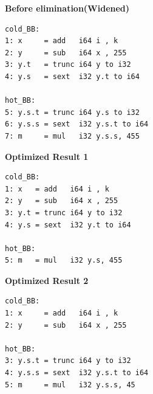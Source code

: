 \par\medskip
\begin{center}
\begin{minipage}{1\textwidth}

\noindent\begin{minipage}[t]{0.52\linewidth}
\raggedright
\textbf{Before elimination(Widened)}\\[0.15em]
\begin{lstlisting}[basicstyle=\ttfamily\normalsize,aboveskip=0pt,belowskip=0pt]
cold_BB:
1: x     = add   i64 i , k
2: y     = sub   i64 x , 255
3: y.t   = trunc i64 y to i32
4: y.s   = sext  i32 y.t to i64

hot_BB:
5: y.s.t = trunc i64 y.s to i32
6: y.s.s = sext  i32 y.s.t to i64
7: m     = mul   i32 y.s.s, 455

\end{lstlisting}
\end{minipage}

\vspace{0.7em}

\noindent\begin{minipage}[t]{0.48\linewidth}
\raggedright
\textbf{Optimized Result 1}\\[0.15em]
\begin{lstlisting}[basicstyle=\ttfamily\normalsize,aboveskip=0pt,belowskip=0pt]
cold_BB:
1: x   = add   i64 i , k
2: y   = sub   i64 x , 255
3: y.t = trunc i64 y to i32
4: y.s = sext  i32 y.t to i64

hot_BB:
5: m   = mul   i32 y.s, 455
\end{lstlisting}
\end{minipage}%
\hfill%
\begin{minipage}[t]{0.48\linewidth}
\raggedright
\textbf{Optimized Result 2}\\[0.15em]
\begin{lstlisting}[basicstyle=\ttfamily\normalsize,aboveskip=0pt,belowskip=0pt]
cold_BB:
1: x     = add   i64 i , k
2: y     = sub   i64 x , 255

hot_BB:
3: y.s.t = trunc i64 y to i32
4: y.s.s = sext  i32 y.s.t to i64
5: m     = mul   i32 y.s.s, 45
\end{lstlisting}
\end{minipage}

\par\vspace{1.2em}
\label{fig:figure6}
\noindent{}
\par\vspace{0.6em}

\end{minipage}
\end{center}
\par\medskip